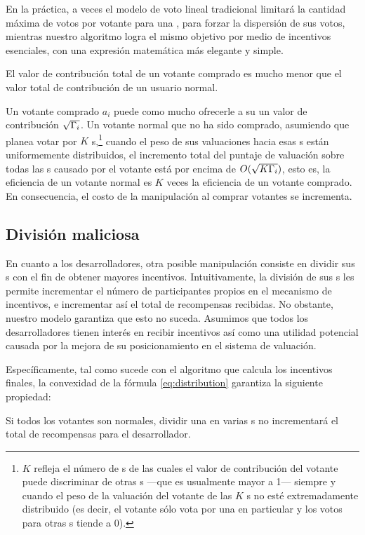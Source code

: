 En la práctica, a veces el modelo de voto lineal tradicional limitará la cantidad máxima de votos por votante para una \dapp, para forzar la dispersión de sus votos, mientras nuestro algoritmo logra el mismo objetivo por medio de incentivos esenciales, con una expresión matemática más elegante y simple.


\begin{corollary}
	El valor de contribución total de un votante comprado es mucho menor que el valor total de contribución de un usuario normal.
\end{corollary}
Un votante comprado $a_i$ puede como mucho ofrecerle a su \dapp un valor de contribución $\sqrt{\Gamma_i}$. Un votante normal que no ha sido comprado, asumiendo que planea votar por $K$ {\dapp}s,\footnote{$K$ refleja el número de {\dapp}s de las cuales el valor de contribución del votante puede discriminar de otras {\dapp}s —que es usualmente mayor a 1— siempre y cuando el peso de la valuación del votante de las $K$ {\dapp}s no esté extremadamente distribuido (es decir, el votante sólo vota por una \dapp en particular y los votos para otras {\dapp}s tiende a 0).} cuando el peso de sus valuaciones hacia esas {\dapp}s están uniformemente distribuidos, el incremento total del puntaje de valuación sobre todas las {\dapp}s causado por el votante está por encima de $O(\sqrt{K\Gamma_i})$, esto es, la eficiencia de un votante normal es $K$ veces la eficiencia de un votante comprado. En consecuencia, el costo de la manipulación al comprar votantes se incrementa.

\subsection{División maliciosa}
\label{subsec:5.2}
\noindent En cuanto a los desarrolladores, otra posible manipulación consiste en dividir sus {\dapp}s con el fin de obtener mayores incentivos. Intuitivamente, la división de sus {\dapp}s les permite incrementar el número de participantes propios en el mecanismo de incentivos, e incrementar así el total de recompensas recibidas. No obstante, nuestro modelo garantiza que esto no suceda. Asumimos que todos los desarrolladores tienen interés en recibir incentivos así como una utilidad potencial causada por la mejora de su posicionamiento en el sistema de valuación.

Específicamente, tal como sucede con el algoritmo que calcula los incentivos finales, la convexidad de la fórmula \ref{eq:distribution} garantiza la siguiente propiedad:
\begin{property}
	\label{p2}
    Si todos los votantes son normales, dividir una \dapp en varias {\dapp}s no incrementará el total de recompensas para el desarrollador.
\end{property}

